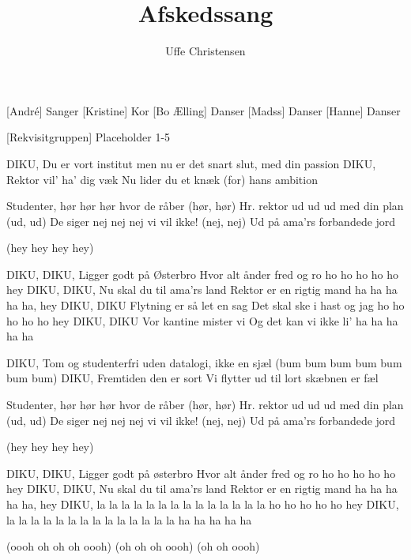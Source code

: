 \documentclass[a4paper,11pt]{article}
\title{Afskedssang}
\author{Uffe Christensen}
\begin{document}
\maketitle

\begin{roles}  
[André] Sanger
[Kristine] Kor
[Bo Ælling] Danser
[Madss] Danser
[Hanne] Danser
\end{roles}

\begin{props}
[Rekvisitgruppen] Placeholder 1-5
\end{props}

\begin{song}
 DIKU,
Du er vort institut
men nu er det snart slut,
med din passion
DIKU,
Rektor vil' ha' dig væk
Nu lider du et knæk
(for) hans ambition

 Studenter, hør hør hør hvor de råber (hør, hør)
Hr. rektor ud ud ud med din plan (ud, ud)
De siger nej nej nej vi vil ikke! (nej, nej)
Ud på ama'rs forbandede jord

 (hey hey hey hey)

DIKU, DIKU,
Ligger godt på Østerbro
Hvor alt ånder fred og ro
ho ho ho ho ho hey
DIKU, DIKU,
Nu skal du til ama'rs land
Rektor er en rigtig mand
ha ha ha ha ha, hey
DIKU, DIKU
Flytning er så let en sag
Det skal ske i hast og jag
ho ho ho ho ho hey
DIKU, DIKU
Vor kantine mister vi
Og det kan vi ikke li'
ha ha ha ha ha

 DIKU,
Tom og studenterfri
uden datalogi,
ikke en sjæl
(bum bum bum bum bum bum bum)
DIKU,
Fremtiden den er sort
Vi flytter ud til lort
skæbnen er fæl

 Studenter, hør hør hør hvor de råber (hør, hør)
 Hr. rektor ud ud ud med din plan (ud, ud)
 De siger nej nej nej vi vil ikke! (nej, nej)
 Ud på ama'rs forbandede jord

 (hey hey hey hey)

DIKU, DIKU,
Ligger godt på østerbro
Hvor alt ånder fred og ro
ho ho ho ho ho hey
DIKU, DIKU,
Nu skal du til ama'rs land
Rektor er en rigtig mand
ha ha ha ha ha, hey
DIKU, 
la la la la la la la
la la la la la la la
ho ho ho ho ho hey
DIKU, 
la la la la la la la
la la la la la la la
ha ha ha ha ha

 (oooh oh oh oh oooh)
(oh oh oh oooh)
(oh oh oooh)


\end{song}
\end{document}
